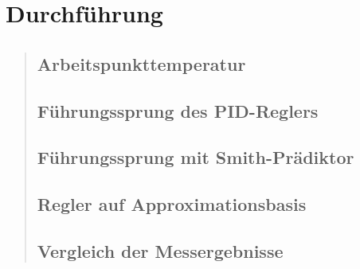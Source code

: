 \section{Durchführung}
\begin{quote}
    
    
    \subsection{Arbeitspunkttemperatur}
    \begin{quote}
        
    \end{quote}
    
    
    \subsection{Führungssprung des PID-Reglers}
    \begin{quote}
        
    \end{quote}
    
    
    \subsection{Führungssprung mit Smith-Prädiktor}
    \begin{quote}
        
    \end{quote}
    
    
    \subsection{Regler auf Approximationsbasis}
    \begin{quote}
        
    \end{quote}
    
    
    \subsection{Vergleich der Messergebnisse}
    \begin{quote}
        
    \end{quote}
    
    
    
    
\end{quote}





